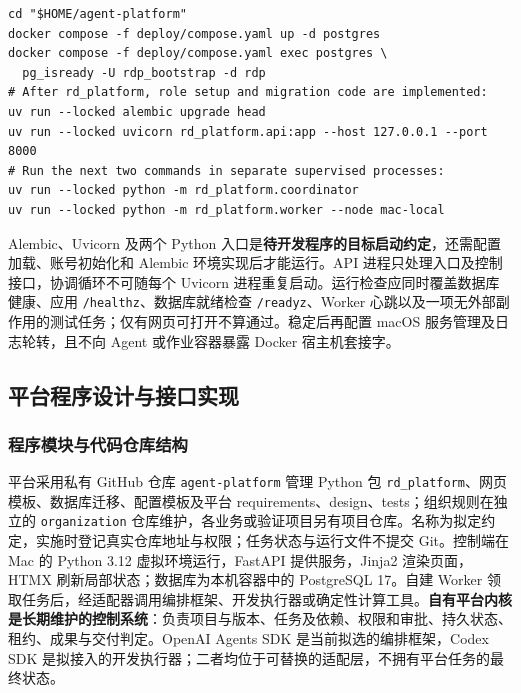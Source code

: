 \documentclass[11pt,a4paper]{article}
\begin{document}
\par\noindent\begin{minipage}{\linewidth}
\begin{lstlisting}
cd "$HOME/agent-platform"
docker compose -f deploy/compose.yaml up -d postgres
docker compose -f deploy/compose.yaml exec postgres \
  pg_isready -U rdp_bootstrap -d rdp
# After rd_platform, role setup and migration code are implemented:
uv run --locked alembic upgrade head
uv run --locked uvicorn rd_platform.api:app --host 127.0.0.1 --port 8000
# Run the next two commands in separate supervised processes:
uv run --locked python -m rd_platform.coordinator
uv run --locked python -m rd_platform.worker --node mac-local
\end{lstlisting}
\end{minipage}\par


Alembic、Uvicorn 及两个 Python 入口是\textbf{待开发程序的目标启动约定}，还需配置加载、账号初始化和 Alembic 环境实现后才能运行。API 进程只处理入口及控制接口，协调循环不可随每个 Uvicorn 进程重复启动。运行检查应同时覆盖数据库健康、应用 \texttt{/healthz}、数据库就绪检查 \texttt{/readyz}、Worker 心跳以及一项无外部副作用的测试任务；仅有网页可打开不算通过。稳定后再配置 macOS 服务管理及日志轮转，且不向 Agent 或作业容器暴露 Docker 宿主机套接字。





\subsection{平台程序设计与接口实现}
\label{sec:platform-implementation}

\subsubsection{程序模块与代码仓库结构}

平台采用私有 GitHub 仓库 \texttt{agent-platform} 管理 Python 包 \texttt{rd\_platform}、网页模板、数据库迁移、配置模板及平台 requirements、design、tests；组织规则在独立的 \texttt{organization} 仓库维护，各业务或验证项目另有项目仓库。名称为拟定约定，实施时登记真实仓库地址与权限；任务状态与运行文件不提交 Git。控制端在 Mac 的 Python 3.12 虚拟环境运行，FastAPI 提供服务，Jinja2 渲染页面，HTMX 刷新局部状态；数据库为本机容器中的 PostgreSQL 17。自建 Worker 领取任务后，经适配器调用编排框架、开发执行器或确定性计算工具。\textbf{自有平台内核是长期维护的控制系统}：负责项目与版本、任务及依赖、权限和审批、持久状态、租约、成果与交付判定。OpenAI Agents SDK 是当前拟选的编排框架，Codex SDK 是拟接入的开发执行器；二者均位于可替换的适配层，不拥有平台任务的最终状态。\cite{rdRuntimeSdk,codex-sdk}
\end{document}
